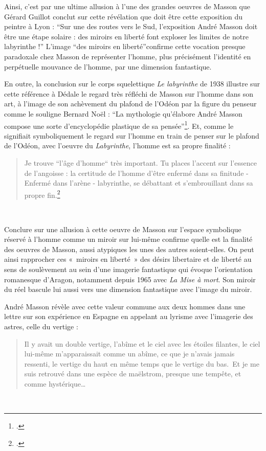 
	 Ainsi, c’est par une ultime allusion à l’une des grandes oeuvres de Masson que Gérard Guillot conclut sur cette révélation que doit être cette exposition du peintre à Lyon : \enquote{Sur une des routes vers le Sud, l’exposition André Masson doit être une étape solaire : des miroirs en liberté font exploser les limites de notre labyrinthe !} L’image \enquote{des miroirs en liberté}confirme cette vocation presque paradoxale chez Masson de représenter l’homme, plus précisément l’identité en perpétuelle mouvance de l’homme, par une dimension fantastique.

	En outre, la conclusion sur le corps squelettique \emph{Le labyrinthe} de 1938 illustre sur cette référence à Dédale le regard très réfléchi de Masson sur l’homme dans son art, à l’image de son achèvement du plafond de l’Odéon par la figure du penseur comme le souligne Bernard Noël : \enquote{La mythologie qu’élabore André Masson compose une sorte d’encyclopédie plastique de sa pensée}\footcite[p73]{noel}. Et, comme le signifiait symboliquement le regard sur l’homme en train de penser sur le plafond de l’Odéon, avec l’oeuvre du \emph{Labyrinthe}, l’homme est sa propre finalité : 
\begin{quote}
Je trouve “l’âge d’homme“ très important. Tu places l’accent sur l’essence de l’angoisse : la certitude de l’homme d’être enfermé dans sa finitude - Enfermé dans l’arène - labyrinthe, se débattant et s’embrouillant dans sa propre fin.\footcite[p429]{anneessurrealistes}	
\end{quote}
 


	 Conclure sur une allusion à cette oeuvre de Masson sur l’espace symbolique réservé à l’homme comme un miroir sur lui-même confirme quelle est la finalité des oeuvres de Masson, aussi atypiques les unes des autres soient-elles. On peut ainsi rapprocher ces « miroirs en liberté » des désirs libertaire et de liberté au sens de soulèvement au sein d’une imagerie fantastique qui évoque l’orientation romanesque d’Aragon, notamment depuis 1965 avec \emph{La Mise à mort}. Son miroir du réel bascule lui aussi vers une dimension fantastique avec l’image du miroir. 

André Masson révèle avec cette valeur commune aux deux hommes dans une lettre sur son expérience en Espagne en appelant au lyrisme avec l’imagerie des astres, celle du vertige : 
\begin{quote}
Il y avait un double vertige, l’abîme et le ciel avec les étoiles filantes, le ciel lui-même m’apparaissait comme un abîme, ce que je n’avais jamais ressenti, le vertige du haut en même temps que le vertige du bas. Et je me suis retrouvé dans une espèce de maëlstrom, presque une tempête, et comme hystérique… 
	
\end{quote}
 

